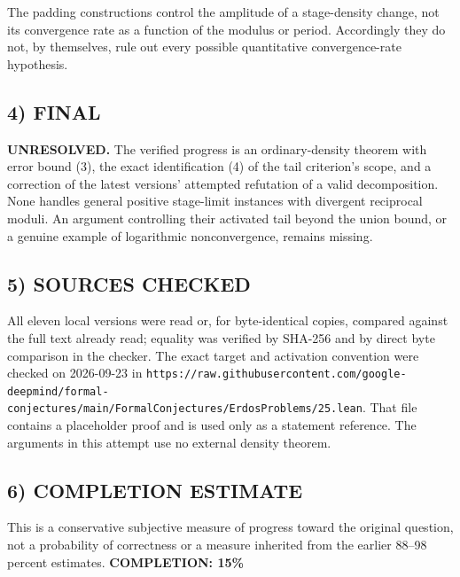 The padding constructions control the amplitude of a stage-density change, not its convergence rate as a function of the modulus or period. Accordingly they do not, by themselves, rule out every possible quantitative convergence-rate hypothesis.

\subsection{4) FINAL}
\textbf{UNRESOLVED.}
The verified progress is an ordinary-density theorem with error bound (3), the exact identification (4) of the tail criterion's scope, and a correction of the latest versions' attempted refutation of a valid decomposition. None handles general positive stage-limit instances with divergent reciprocal moduli. An argument controlling their activated tail beyond the union bound, or a genuine example of logarithmic nonconvergence, remains missing.

\subsection{5) SOURCES CHECKED}
All eleven local versions were read or, for byte-identical copies, compared against the full text already read; equality was verified by SHA-256 and by direct byte comparison in the checker. The exact target and activation convention were checked on 2026-09-23 in \texttt{https://raw.githubusercontent.com/google-deepmind/formal-conjectures/main/FormalConjectures/ErdosProblems/25.lean}. That file contains a placeholder proof and is used only as a statement reference. The arguments in this attempt use no external density theorem.

\subsection{6) COMPLETION ESTIMATE}
This is a conservative subjective measure of progress toward the original question, not a probability of correctness or a measure inherited from the earlier 88--98 percent estimates.
\textbf{COMPLETION: 15\%}
